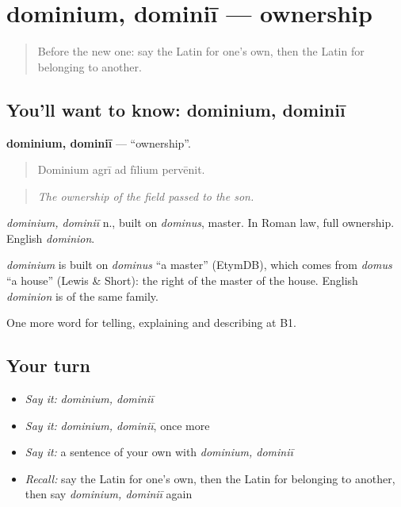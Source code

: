 \section[dominium, dominiī]{dominium, dominiī — ownership}

\label{lesson:LA-C417-dominium}



\begin{quote}
Before the new one: say the Latin for one's own, then the Latin for belonging to another.
\end{quote}

\subsection*{You'll want to know: dominium, dominiī}
\textbf{dominium, dominiī} — \textquotedblleft{}ownership\textquotedblright{}.

\begin{quote}
Dominium agrī ad fīlium pervēnit.
\end{quote}

\begin{quote}
\emph{The ownership of the field passed to the son.}
\end{quote}

\emph{dominium, dominiī} n., built on \emph{dominus}, master. In Roman law, full ownership. English \emph{dominion}.

\begin{cousinweb}
\emph{dominium} is built on \emph{dominus} \textquotedblleft{}a master\textquotedblright{} (EtymDB), which comes from \emph{domus} \textquotedblleft{}a house\textquotedblright{} (Lewis \& Short): the right of the master of the house. English \emph{dominion} is of the same family.
\end{cousinweb}

\begin{grammarlens}[title={What you've built}]
One more word for telling, explaining and describing at B1.
\end{grammarlens}

\subsection*{Your turn}
\begin{itemize}
\raggedright
  \item \emph{Say it:} \emph{dominium, dominiī}
  \item \emph{Say it:} \emph{dominium, dominiī}, once more
  \item \emph{Say it:} a sentence of your own with \emph{dominium, dominiī}
  \item \emph{Recall:} say the Latin for one's own, then the Latin for belonging to another, then say \emph{dominium, dominiī} again
\end{itemize}

